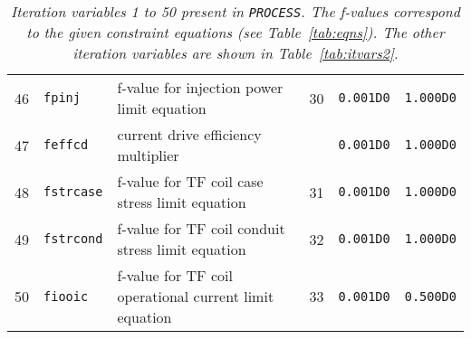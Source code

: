 \documentclass[11pt,a4paper]{report}
\newcommand{\process}{\mbox{\texttt{PROCESS}}}
\begin{document}
\begin{table}[tbph]
\begin{center}
\begin{tabular}{||c|l|l|c|c|c||}
46  & \texttt{fpinj}    & f-value for injection power limit equation    & 30  & \texttt{0.001D0} & \texttt{1.000D0} \\
47  & \texttt{feffcd}   & current drive efficiency multiplier           &     & \texttt{0.001D0} & \texttt{1.000D0} \\
48  & \texttt{fstrcase} & f-value for TF coil case stress limit equation & 31  & \texttt{0.001D0} & \texttt{1.000D0} \\
49  & \texttt{fstrcond} & f-value for TF coil conduit stress limit equation & 32  & \texttt{0.001D0} & \texttt{1.000D0} \\
50  & \texttt{fiooic}   & f-value for TF coil operational current limit equation & 33  & \texttt{0.001D0} & \texttt{0.500D0} \\
\hline
\end{tabular}
\end{center}
\caption[List of iteration variables 1 to 50]
{\label{tab:itvars1}
  \textit{Iteration variables 1 to 50 present in \process. The f-values correspond to the
    given constraint equations (see Table~\ref{tab:eqns}). The other iteration
    variables are shown in Table~\ref{tab:itvars2}.}
}
\end{table}
\normalsize
\end{document}
